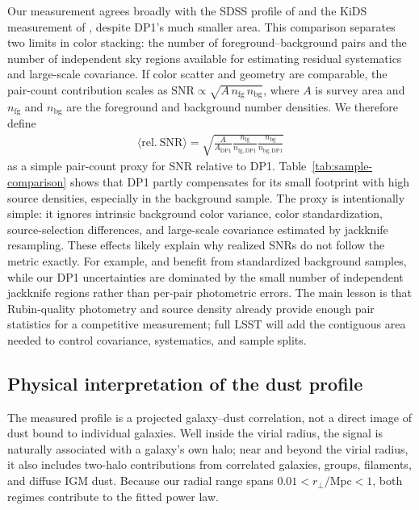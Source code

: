 \documentclass[linenumbers, twocolumn]{aastex701}
\begin{document}
Our measurement agrees broadly with the SDSS profile of \citet{menard2010} and the KiDS measurement of \citet{genc2025}, despite DP1's much smaller area.
This comparison separates two limits in color stacking: the number of foreground--background pairs and the number of independent sky regions available for estimating residual systematics and large-scale covariance.
If color scatter and geometry are comparable, the pair-count contribution scales as $\mathrm{SNR} \propto \sqrt{A \, n_\mathrm{fg} \, n_\mathrm{bg}}$, where $A$ is survey area and $n_\mathrm{fg}$ and $n_\mathrm{bg}$ are the foreground and background number densities.
We therefore define
\begin{align}
    \langle \mathrm{rel.~SNR} \rangle = \sqrt{
        \frac{A}{A_\mathrm{DP1}}
        \frac{n_\mathrm{fg}}{n_\mathrm{fg,DP1}}
        \frac{n_\mathrm{bg}}{n_\mathrm{bg,DP1}}
    }
    \label{eq:relative-snr}
\end{align}
as a simple pair-count proxy for SNR relative to DP1.
Table~\ref{tab:sample-comparison} shows that DP1 partly compensates for its small footprint with high source densities, especially in the background sample.
The proxy is intentionally simple: it ignores intrinsic background color variance, color standardization, source-selection differences, and large-scale covariance estimated by jackknife resampling.
These effects likely explain why realized SNRs do not follow the metric exactly.
For example, \citet{peek2015} and \citet{mccleary2025} benefit from standardized background samples, while our DP1 uncertainties are dominated by the small number of independent jackknife regions rather than per-pair photometric errors.
The main lesson is that Rubin-quality photometry and source density already provide enough pair statistics for a competitive measurement; full LSST will add the contiguous area needed to control covariance, systematics, and sample splits.

\subsection{Physical interpretation of the dust profile}

The measured profile is a projected galaxy--dust correlation, not a direct image of dust bound to individual galaxies.
Well inside the virial radius, the signal is naturally associated with a galaxy's own halo; near and beyond the virial radius, it also includes two-halo contributions from correlated galaxies, groups, filaments, and diffuse IGM dust.
Because our radial range spans $0.01<r_\perp/\mathrm{Mpc}<1$, both regimes contribute to the fitted power law.
\end{document}
